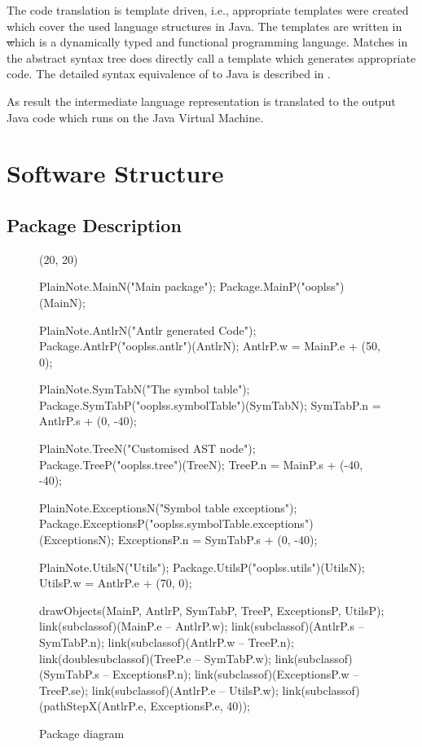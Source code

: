 The code translation is template driven, i.e., appropriate templates
were created which cover the used language structures in Java. The
templates are written in \st which is a dynamically typed and functional
programming language. Matches in the abstract syntax tree does directly
call a template which generates appropriate code. The detailed syntax
equivalence of \ooplss to Java is described in .

As result the intermediate language representation is translated to the
output Java code which runs on the Java Virtual Machine.

\section{Software Structure}

\subsection{Package Description}

\begin{figure}[H]
\centering
	\begin{emp}[classdiag](20, 20)

	PlainNote.MainN("Main package");
	Package.MainP("ooplss")(MainN);

	PlainNote.AntlrN("Antlr generated Code");
	Package.AntlrP("ooplss.antlr")(AntlrN);
	AntlrP.w = MainP.e + (50, 0);

	PlainNote.SymTabN("The symbol table");
	Package.SymTabP("ooplss.symbolTable")(SymTabN);
	SymTabP.n = AntlrP.s + (0, -40);

	PlainNote.TreeN("Customised AST node");
	Package.TreeP("ooplss.tree")(TreeN);
	TreeP.n = MainP.s + (-40, -40);

	PlainNote.ExceptionsN("Symbol table exceptions");
	Package.ExceptionsP("ooplss.symbolTable.exceptions")(ExceptionsN);
	ExceptionsP.n = SymTabP.s + (0, -40);

	PlainNote.UtilsN("Utils");
	Package.UtilsP("ooplss.utils")(UtilsN);
	UtilsP.w = AntlrP.e + (70, 0);

	drawObjects(MainP, AntlrP, SymTabP, TreeP, ExceptionsP, UtilsP);
	link(subclassof)(MainP.e -- AntlrP.w);
	link(subclassof)(AntlrP.s -- SymTabP.n);
	link(subclassof)(AntlrP.w -- TreeP.n);
	link(doublesubclassof)(TreeP.e -- SymTabP.w);
	link(subclassof)(SymTabP.s -- ExceptionsP.n);
	link(subclassof)(ExceptionsP.w -- TreeP.se);
	link(subclassof)(AntlrP.e -- UtilsP.w);
	link(subclassof)(pathStepX(AntlrP.e, ExceptionsP.e, 40));

	\end{emp}
	\caption{Package diagram}
	\label{fig:classes}
\end{figure}


